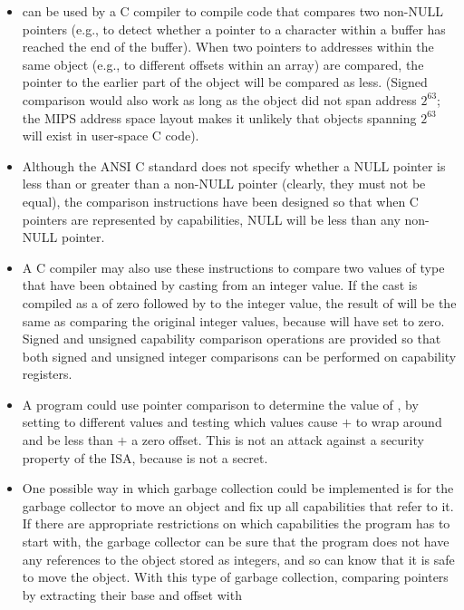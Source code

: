 \begin{itemize}
\item
{} can be used by a C compiler to compile code that
compares two non-NULL pointers (e.g., to detect whether a pointer to a character
within a buffer has reached the end of the buffer). When two pointers to
addresses within the same object (e.g., to different offsets within an array)
are compared, the pointer to the earlier part of the object will be compared
as less. (Signed comparison would also work as long as the object did not span
 address $2^{63}$; the MIPS address space layout makes it unlikely that
objects spanning $2^{63}$ will exist in user-space C code).
\item
Although the ANSI C standard does not specify whether a NULL
pointer is less than or greater than a non-NULL pointer (clearly, they must
not be equal), the comparison instructions have been designed so that when
C pointers are represented by capabilities, NULL will be less than any
non-NULL pointer.
\item
A C compiler may also use these instructions to compare two values of
type  that have been obtained by casting from
an integer value. If the cast is compiled as a  of
zero followed by  to the integer value, the
result of  will be the same as comparing the original
integer values, because  will have set \cbase{} to
zero. Signed and unsigned capability comparison operations are provided so
that both signed and unsigned integer comparisons can be performed on
capability registers.
\item
A program could use pointer comparison to determine the value of
\cbase{}, by setting \coffset{} to different values and testing which values
cause \cbase{} $+$ \coffset{} to wrap around and be less than \cbase{} $+$
a zero offset. This is not an attack against a security property of the ISA,
because \cbase{} is not a secret.
\item
One possible way in which garbage collection could be implemented is for the
garbage collector to move an object and fix up all capabilities that refer
to it. If there are appropriate restrictions on which capabilities the program
has to start with, the garbage collector can be sure that the program does
not have any references to the object stored as integers, and so can know
that it is safe to move the object. With this type of garbage collection,
comparing pointers by extracting their base and offset with

\end{itemize}
